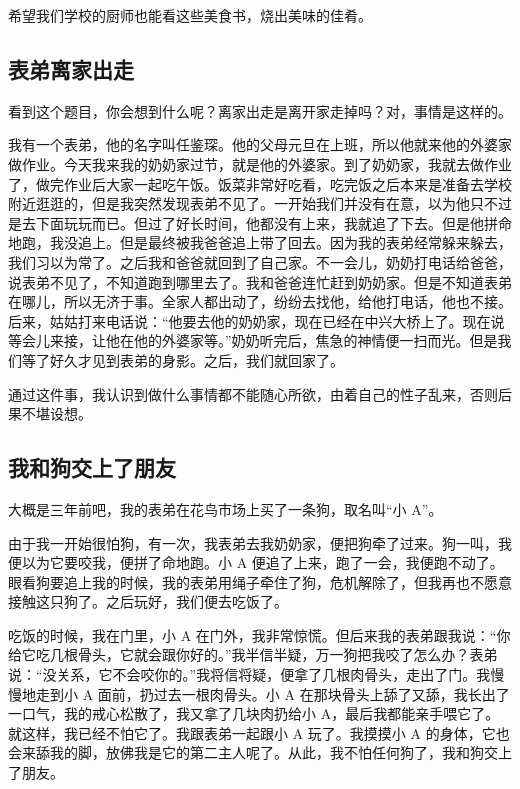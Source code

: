 \documentclass[UTF8,a4paper,titlepage,twoside,10.5pt]{article}
\begin{document}
希望我们学校的厨师也能看这些美食书，烧出美味的佳肴。

\subsection{表弟离家出走}
\label{sec:orge0bf8c4}

看到这个题目，你会想到什么呢？离家出走是离开家走掉吗？对，事情是这样的。

我有一个表弟，他的名字叫任鉴琛。他的父母元旦在上班，所以他就来他的外婆家做作业。今天我来我的奶奶家过节，就是他的外婆家。到了奶奶家，我就去做作业了，做完作业后大家一起吃午饭。饭菜非常好吃看，吃完饭之后本来是准备去学校附近逛逛的，但是我突然发现表弟不见了。一开始我们并没有在意，以为他只不过是去下面玩玩而已。但过了好长时间，他都没有上来，我就追了下去。但是他拼命地跑，我没追上。但是最终被我爸爸追上带了回去。因为我的表弟经常躲来躲去，我们习以为常了。之后我和爸爸就回到了自己家。不一会儿，奶奶打电话给爸爸，说表弟不见了，不知道跑到哪里去了。我和爸爸连忙赶到奶奶家。但是不知道表弟在哪儿，所以无济于事。全家人都出动了，纷纷去找他，给他打电话，他也不接。后来，姑姑打来电话说：“他要去他的奶奶家，现在已经在中兴大桥上了。现在说等会儿来接，让他在他的外婆家等。”奶奶听完后，焦急的神情便一扫而光。但是我们等了好久才见到表弟的身影。之后，我们就回家了。

通过这件事，我认识到做什么事情都不能随心所欲，由着自己的性子乱来，否则后果不堪设想。

\subsection{我和狗交上了朋友}
\label{sec:org621b4c8}

大概是三年前吧，我的表弟在花鸟市场上买了一条狗，取名叫“小 A”。

由于我一开始很怕狗，有一次，我表弟去我奶奶家，便把狗牵了过来。狗一叫，我便以为它要咬我，便拼了命地跑。小 A 便追了上来，跑了一会，我便跑不动了。眼看狗要追上我的时候，我的表弟用绳子牵住了狗，危机解除了，但我再也不愿意接触这只狗了。之后玩好，我们便去吃饭了。

吃饭的时候，我在门里，小 A 在门外，我非常惊慌。但后来我的表弟跟我说：“你给它吃几根骨头，它就会跟你好的。”我半信半疑，万一狗把我咬了怎么办？表弟说：“没关系，它不会咬你的。”我将信将疑，便拿了几根肉骨头，走出了门。我慢慢地走到小 A 面前，扔过去一根肉骨头。小 A 在那块骨头上舔了又舔，我长出了一口气，我的戒心松散了，我又拿了几块肉扔给小 A，最后我都能亲手喂它了。就这样，我已经不怕它了。我跟表弟一起跟小 A 玩了。我摸摸小 A 的身体，它也会来舔我的脚，放佛我是它的第二主人呢了。从此，我不怕任何狗了，我和狗交上了朋友。
\end{document}
